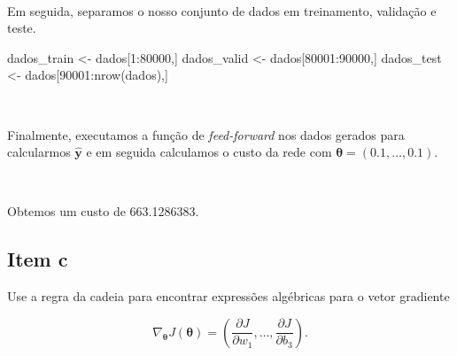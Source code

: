 \documentclass[
  a4paperpaper,
]{article}
\newenvironment{Shaded}{\begin{snugshade}}{\end{snugshade}}
\newcommand{\CommentTok}[1]{\textcolor[rgb]{0.37,0.37,0.37}{#1}}
\newcommand{\DecValTok}[1]{\textcolor[rgb]{0.68,0.00,0.00}{#1}}
\newcommand{\FunctionTok}[1]{\textcolor[rgb]{0.28,0.35,0.67}{#1}}
\newcommand{\NormalTok}[1]{\textcolor[rgb]{0.00,0.23,0.31}{#1}}
\newcommand{\OtherTok}[1]{\textcolor[rgb]{0.00,0.23,0.31}{#1}}
\newcommand{\SpecialCharTok}[1]{\textcolor[rgb]{0.37,0.37,0.37}{#1}}
\begin{document}
~

Em seguida, separamos o nosso conjunto de dados em treinamento,
validação e teste.

\begin{Shaded}
\begin{Highlighting}[]
\NormalTok{dados\_train }\OtherTok{\textless{}{-}}\NormalTok{ dados[}\DecValTok{1}\SpecialCharTok{:}\DecValTok{80000}\NormalTok{,]}
\NormalTok{dados\_valid }\OtherTok{\textless{}{-}}\NormalTok{ dados[}\DecValTok{80001}\SpecialCharTok{:}\DecValTok{90000}\NormalTok{,]}
\NormalTok{dados\_test }\OtherTok{\textless{}{-}}\NormalTok{ dados[}\DecValTok{90001}\SpecialCharTok{:}\FunctionTok{nrow}\NormalTok{(dados),]}
\end{Highlighting}
\end{Shaded}

~

Finalmente, executamos a função de \emph{feed-forward} nos dados gerados
para calcularmos \(\boldsymbol{\hat{y}}\) e em seguida calculamos o
custo da rede com \(\boldsymbol{\theta} = (0.1, \dots, 0.1)\).

\begin{Shaded}
\end{Shaded}

~

Obtemos um custo de 663.1286383.

\subsection{Item c}\label{item-c}

Use a regra da cadeia para encontrar expressões algébricas para o vetor
gradiente

\[
\nabla_{\boldsymbol{\theta}}J(\boldsymbol{\theta}) = \left( \frac{\partial J}{\partial w_1}, \dots, \frac{\partial J}{\partial b_3} \right).
\]
\end{document}
